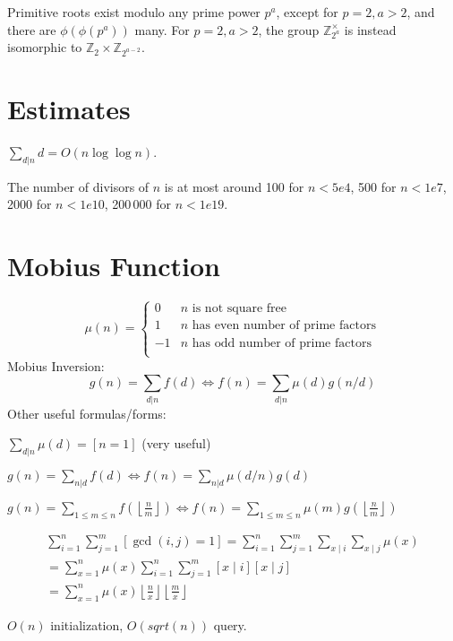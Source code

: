 	Primitive roots exist modulo any prime power $p^a$, except for $p = 2, a > 2$, and there are $\phi(\phi(p^a))$ many.
	For $p = 2, a > 2$, the group $\mathbb Z_{2^a}^\times$ is instead isomorphic to $\mathbb Z_2 \times \mathbb Z_{2^{a-2}}$.

\section{Estimates}
	$\sum_{d|n} d = O(n \log \log n)$.

	The number of divisors of $n$ is at most around 100 for $n < 5e4$, 500 for $n < 1e7$, 2000 for $n < 1e10$, 200\,000 for $n < 1e19$.

\section{Mobius Function}
\[
	\mu(n) = \begin{cases} 0 & n \textrm{ is not square free}\\ 1 & n \textrm{ has even number of prime factors}\\ -1 & n \textrm{ has odd number of prime factors}\\\end{cases}
\]
  Mobius Inversion:
  \[ g(n) = \sum_{d|n} f(d) \Leftrightarrow f(n) = \sum_{d|n} \mu(d)g(n/d) \]
  Other useful formulas/forms:

  $ \sum_{d | n} \mu(d) = [ n = 1] $ (very useful)

  $ g(n) = \sum_{n|d} f(d) \Leftrightarrow f(n) = \sum_{n|d} \mu(d/n)g(d)$

 $ g(n) = \sum_{1 \leq m \leq n} f(\left\lfloor\frac{n}{m}\right \rfloor ) \Leftrightarrow f(n) = \sum_{1\leq m\leq n} \mu(m)g(\left\lfloor\frac{n}{m}\right\rfloor)$

 \begin{small}
 \begin{equation}
	\begin{gathered}
	\sum_{i=1}^n \sum_{j=1}^m[\operatorname{gcd}(i, j)=1]=\sum_{i=1}^n \sum_{j=1}^m \sum_{x \mid i} \sum_{x \mid j} \mu(x) \\
	=\sum_{x=1}^n \mu(x) \sum_{i=1}^n \sum_{j=1}^m[x \mid i][x \mid j] \\
	=\sum_{x=1}^n \mu(x)\left\lfloor\frac{n}{x}\right\rfloor\left\lfloor\frac{m}{x}\right\rfloor
	\end{gathered}
	\end{equation}
\end{small}
$O(n)$ initialization, $O(sqrt(n))$ query.

